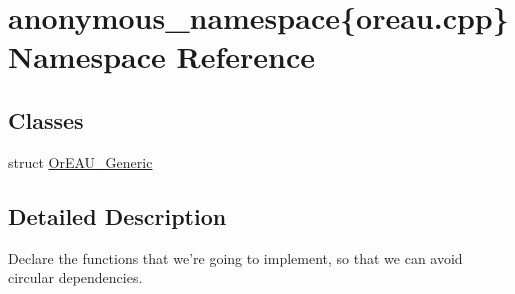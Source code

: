 \hypertarget{namespaceanonymous__namespace_02oreau_8cpp_03}{\section{anonymous\-\_\-namespace\{oreau.\-cpp\} Namespace Reference}
\label{namespaceanonymous__namespace_02oreau_8cpp_03}
}
\subsection*{Classes}
\begin{DoxyCompactItemize}
\item 
struct \hyperlink{structanonymous__namespace_02oreau_8cpp_03_1_1OrEAU__Generic}{Or\-E\-A\-U\-\_\-\-Generic}
\end{DoxyCompactItemize}


\subsection{Detailed Description}
Declare the functions that we're going to implement, so that we can avoid circular dependencies. 